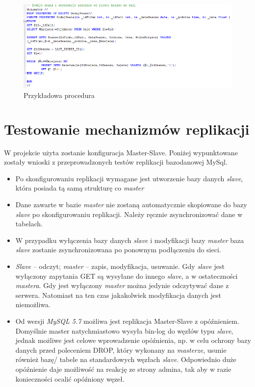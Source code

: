 \begin{figure} [H]
	\centering
	\includegraphics[width=1\linewidth]{rozdzial04/P_DodajSeans.png}
	\caption{Przykładowa procedura}
	\label{fig:p_DodajSeans}
\end{figure}

\section{Testowanie mechanizmów replikacji}
\label{chap:testReplikacji}

W projekcie użyta zostanie konfiguracja Master-Slave. Poniżej wypunktowane zostały wnioski z przeprowadzonych testów replikacji bazodanowej MySql.

\begin{itemize}
	\item Po skonfigurowaniu replikacji wymagane jest utworzenie bazy danych \textit{slave}, która posiada
	tą samą strukturę co \textit{master}
	\item Dane zawarte w bazie \textit{master} nie zostaną automatycznie skopiowane do bazy \textit{slave} po
	skonfigurowaniu replikacji. Należy ręcznie zsynchronizować dane w tabelach.
	\item W przypadku wyłączenia bazy danych \textit{slave} i modyfikacji bazy \textit{master} baza \textit{slave} zostanie
	zsynchronizowana po ponownym podłączeniu do sieci.
	\item \textit{Slave} – odczyt; \textit{master} – zapis, modyfikacja, usuwanie. Gdy \textit{slave} jest wyłączony zapytania
	GET są wysyłane do innego \textit{slave}, a w ostateczności \textit{mastera}. Gdy jest wyłączony \textit{master}
	można jedynie odczytywać dane z serwera. Natomiast na ten czas jakakolwiek modyfikacja
	danych jest niemożliwa.
	\item Od wersji\textit{ MySQL 5.7} możliwa jest replikacja Master-Slave z opóźnieniem. Domyślnie master natychmiastowo wysyła bin-log do węzłów typu \textit{slave}, jednak możliwe jest celowe wprowadzenie opóźnienia, np. w celu ochrony bazy danych przed poleceniem DROP, który wykonany na \textit{masterze}, usunie również bazę/ tabele na standardowych węzłach \textit{slave}. Odpowiednio duże opóźnienie daje możliwość na reakcję ze strony admina, tak aby w razie konieczności ocalić opóźniony węzeł.
\end{itemize}